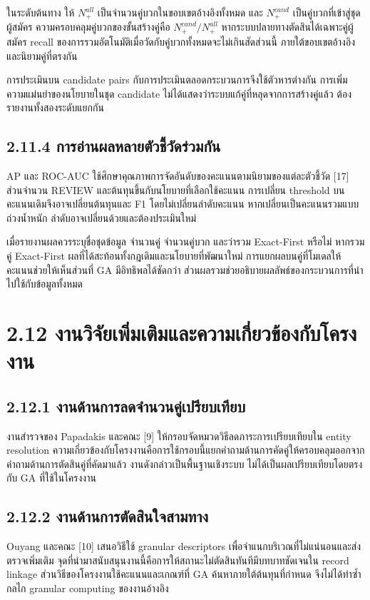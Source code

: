 \documentclass[12pt,a4paper]{report}
\begin{document}
ในระดับต้นทาง ให้ $N_+^{all}$ เป็นจำนวนคู่บวกในขอบเขตอ้างอิงทั้งหมด และ $N_+^{cand}$ เป็นคู่บวกที่เข้าสู่ชุดผู้สมัคร ความครอบคลุมคู่บวกของขั้นสร้างคู่คือ $N_+^{cand}/N_+^{all}$ หากระบบปลายทางตัดสินได้เฉพาะคู่ผู้สมัคร recall ของการรวมอัตโนมัติเมื่อวัดกับคู่บวกทั้งหมดจะไม่เกินสัดส่วนนี้ ภายใต้ขอบเขตอ้างอิงและนิยามคู่ที่ตรงกัน

การประเมินบน candidate pairs กับการประเมินตลอดกระบวนการจึงใช้ตัวหารต่างกัน การเพิ่มความแม่นยำของนโยบายในชุด candidate ไม่ได้แสดงว่าระบบแก้คู่ที่หลุดจากการสร้างคู่แล้ว ต้องรายงานทั้งสองระดับแยกกัน

\subsection*{2.11.4 การอ่านผลหลายตัวชี้วัดร่วมกัน}
AP และ ROC-AUC ใช้ศึกษาคุณภาพการจัดอันดับของคะแนนตามนิยามของแต่ละตัวชี้วัด [17] ส่วนจำนวน REVIEW และต้นทุนขึ้นกับนโยบายที่เลือกใช้คะแนน การเปลี่ยน threshold บนคะแนนเดิมจึงอาจเปลี่ยนต้นทุนและ F1 โดยไม่เปลี่ยนลำดับคะแนน หากเปลี่ยนเป็นคะแนนรวมแบบถ่วงน้ำหนัก ลำดับอาจเปลี่ยนด้วยและต้องประเมินใหม่

เมื่อรายงานผลควรระบุชื่อชุดข้อมูล จำนวนคู่ จำนวนคู่บวก และว่ารวม Exact-First หรือไม่ หากรวมคู่ Exact-First ผลที่ได้สะท้อนทั้งกฎเดิมและนโยบายที่พัฒนาใหม่ การแยกผลบนคู่ที่โมเดลให้คะแนนช่วยให้เห็นส่วนที่ GA มีอิทธิพลได้ชัดกว่า ส่วนผลรวมช่วยอธิบายผลลัพธ์ของกระบวนการที่นำไปใช้กับข้อมูลทั้งหมด

\section*{2.12 งานวิจัยเพิ่มเติมและความเกี่ยวข้องกับโครงงาน}
\subsection*{2.12.1 งานด้านการลดจำนวนคู่เปรียบเทียบ}
งานสำรวจของ Papadakis และคณะ [9] ให้กรอบจัดหมวดวิธีลดภาระการเปรียบเทียบใน entity resolution ความเกี่ยวข้องกับโครงงานคือการใช้กรอบนี้แยกคำถามด้านการคัดคู่ให้ครอบคลุมออกจากคำถามด้านการตัดสินคู่ที่คัดมาแล้ว งานดังกล่าวเป็นพื้นฐานเชิงระบบ ไม่ได้เป็นผลเปรียบเทียบโดยตรงกับ GA ที่ใช้ในโครงงาน

\subsection*{2.12.2 งานด้านการตัดสินใจสามทาง}
Ouyang และคณะ [10] เสนอวิธีใช้ granular descriptors เพื่อจำแนกบริเวณที่ไม่แน่นอนและส่งตรวจเพิ่มเติม จุดที่นำมาสนับสนุนงานนี้คือการให้สถานะไม่ตัดสินทันทีมีบทบาทชัดเจนใน record linkage ส่วนวิธีของโครงงานใช้คะแนนและเกณฑ์ที่ GA ค้นหาภายใต้ต้นทุนที่กำหนด จึงไม่ได้ทำซ้ำกลไก granular computing ของงานอ้างอิง
\end{document}
